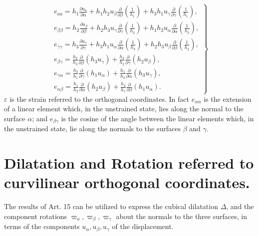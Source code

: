 \[
\left.\begin{array}{l}
e_{a a}=h_1 \frac{\partial u_a}{\partial \alpha}+h_1 h_2 u_\beta
\frac{\partial}{\partial \beta}\left(\frac{1}{h_1}\right)+h_3 h_1 u_\gamma
\frac{\partial}{\partial \gamma}\left(\frac{1}{h_1}\right), \\
e_{\beta \beta}=h_2 \frac{\partial u_\beta}{\partial \beta}+h_2 h_3 u_\gamma
\frac{\partial}{\partial \gamma}\left(\frac{1}{h_2}\right)+h_1 h_2 u_\alpha
\frac{\partial}{\partial \alpha}\left(\frac{1}{h_2}\right), \\
e_{\gamma \gamma}=h_3 \frac{\partial u_\gamma}{\partial \gamma}+h_3 h_1
u_\alpha \frac{\partial}{\partial \alpha}\left(\frac{1}{h_3}\right)+h_2 h_3
u_\beta \frac{\partial}{\partial \beta}\left(\frac{1}{h_2}\right), \\
e_{\beta \gamma}=\frac{h_2}{h_3} \frac{\partial}{\partial \beta}\left(h_3
u_\gamma \right)+\frac{h_3}{h_2} \frac{\partial}{\partial \gamma}\left(h_2
u_\beta \right), \\
e_{\gamma \alpha}=\frac{h_3}{h_1} \frac{\partial}{\partial \gamma}\left(h_1
u_\alpha \right)+\frac{h_1}{h_3} \frac{\partial}{\partial \alpha}\left(h_3
u_\gamma \right), \\
e_{\alpha \beta}=\frac{h_1}{h_2} \frac{\partial}{\partial \alpha}\left(h_2
u_\beta \right)+\frac{h_2}{h_1} \frac{\partial}{\partial \beta}\left(h_1
u_\alpha \right) .
\end{array}\right\}
\]
\(\varepsilon \) is the strain referred to the orthogonal coordinates.
In fact
\(e_{\alpha \alpha}\) is the extension of a linear element which, in the
unstrained state, lies along the normal to the surface \(\alpha \); and
\(e_{\beta \gamma}\) is the cosine of the angle between the linear
elements which, in the unstrained state, lie along the normals to the
surfaces \(\beta \) and \(\gamma \).

\section[Curvilinear Rotation]{Dilatation and Rotation referred to curvilinear orthogonal coordinates.}

The results of Art. 15 can be utilized to express the cubical dilatation
\(\Delta \), and the component rotations \(\varpi_a, \varpi_\beta, \varpi_\gamma \)
about the normals to the three surfaces, in terms of the components
\(u_\alpha, u_\beta, u_\gamma \) of the displacement.

